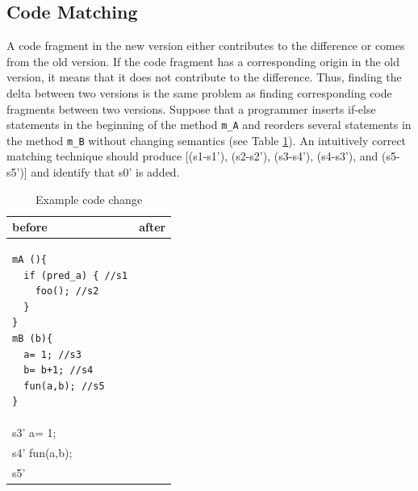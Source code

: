 \documentclass[runningheads,a4paper]{llncs}
\newcommand{\codefont}[1]{\footnotesize{\texttt{#1}}\normalsize}
\begin{document}
\subsection{Code Matching} 
		\label{related_codematching}

A code fragment in the new version either contributes to the difference or comes from the old version. If the code fragment has a corresponding origin in the old version, it means that it does not contribute to the difference. Thus, finding the delta between two versions is the same problem as finding corresponding code fragments between two versions. 
Suppose that a programmer inserts if-else statements in the beginning of the method \codefont{m\_A} and reorders several statements in the method \codefont{m\_B} without changing semantics (see Table \ref{code}). An intuitively correct matching technique should produce [(s1-s1'), (s2-s2'), (s3-s4'), (s4-s3'), and (s5-s5')] and identify that s0' is added.  
\begin{table} 
\footnotesize
\caption{Example code change}
\begin{tabular}{|p{}|p{}|} \hline
before & after \\ \hline
\begin{verbatim} 
mA (){
  if (pred_a) { //s1
    foo(); //s2
  } 
}
mB (b){ 
  a= 1; //s3
  b= b+1; //s4
  fun(a,b); //s5
} \end{verbatim} 
& 
\begin{verbatim} 
mA (){
  if (pred_a0) { //s0'
    if (pred_a) { //s1'
      foo(); //s2'
    } 
  }
}
mB (b){ 
  b= b+1; \\s3'
  a= 1; \\s4'
  fun(a,b); \\s5'
}\end{verbatim} \\ \hline
\end{tabular} 
\label{code} 
\end{table}
\end{document}
